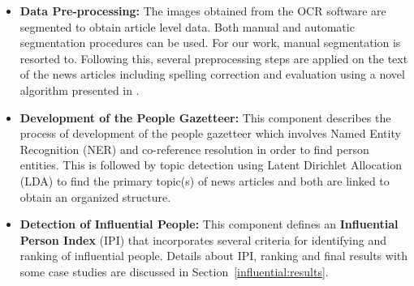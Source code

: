 \begin{itemize}
\item \textbf{Data Pre-processing: } The images obtained from the OCR software are segmented to obtain article level data. Both manual and automatic segmentation procedures can be used. 
For our work, manual segmentation is resorted to.
Following this, several preprocessing steps are applied on the text of the news
articles including  spelling correction and evaluation using a novel algorithm presented in \cite{Gupta_14a}.

\item \textbf{Development of the People Gazetteer: }This component describes the process of development
of the people gazetteer which involves Named Entity Recognition (NER) and co-reference resolution in order to find person
entities. This is followed by topic detection using Latent Dirichlet Allocation (LDA) to find the primary topic(s) of news articles
and both are linked to obtain an organized structure.

\item \textbf{Detection of Influential People: } This component defines an \textbf{Influential Person Index}
(IPI) that incorporates several criteria for identifying and ranking of influential
people. Details about IPI, ranking and final results with some case studies are discussed in Section~\ref{influential:results}.
\end{itemize}